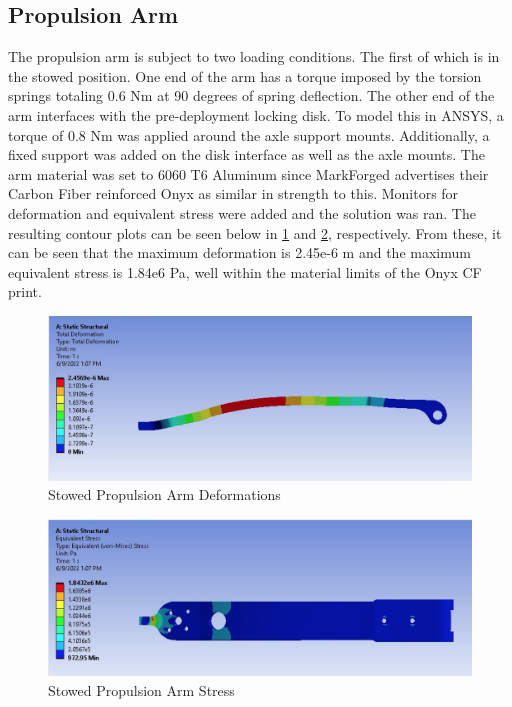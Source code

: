 \subsection{Propulsion Arm}
\label{propulsionarmansys}
The propulsion arm is subject to two loading conditions. The first of which is in the stowed position. One end of the arm has a torque imposed by the torsion springs totaling 0.6 Nm at 90 degrees of spring deflection. The other end of the arm interfaces with the pre-deployment locking disk. To model this in ANSYS, a torque of 0.8 Nm was applied around the axle support mounts. Additionally, a fixed support was added on the disk interface as well as the axle mounts. The arm material was set to 6060 T6 Aluminum since MarkForged advertises their Carbon Fiber reinforced Onyx as similar in strength to this. Monitors for deformation and equivalent stress were added and the solution was ran. The resulting contour plots can be seen below in \ref{fig:stowedarmdef} and \ref{fig:stowedarmstress}, respectively. From these, it can be seen that the maximum deformation is 2.45e-6 m and the maximum equivalent stress is 1.84e6 Pa, well within the material limits of the Onyx CF print.
\begin{figure}[H]
    \centering
    \includegraphics[width=\textwidth]{src/figs/stowed-arm-def.png}
    \caption{Stowed Propulsion Arm Deformations}
    \label{fig:stowedarmdef}
\end{figure}
\begin{figure}[H]
    \centering
    \includegraphics[width=\textwidth]{src/figs/stowed-arm-stress.png}
    \caption{Stowed Propulsion Arm Stress}
    \label{fig:stowedarmstress}
\end{figure}

